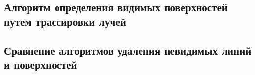 \subsection{Алгоритм определения видимых поверхностей путем трассировки лучей}

\subsection{Сравнение алгоритмов удаления невидимых линий и поверхностей}











